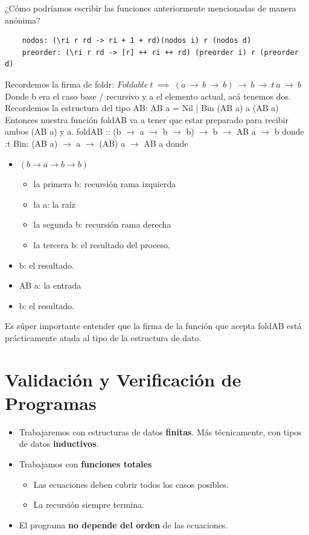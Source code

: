 \documentclass[10pt,a4paper]{article}
\begin{document}
¿Cómo podríamos escribir las funciones anteriormente mencionadas de manera anónima? 
\begin{lstlisting}
    nodos: (\ri r rd -> ri + 1 + rd)(nodos i) r (nodos d)
    preorder: (\ri r rd -> [r] ++ ri ++ rd) (preorder i) r (preorder d)
\end{lstlisting}
Recordemos la firma de foldr: $Foldable \ t \ \implies \ (a \ \rightarrow \ b \ \rightarrow \ b) \ \rightarrow \ b \ \rightarrow \ t \ a \ \rightarrow \ b$ \\
Donde b era el caso base / recursivo y a el elemento actual, acá tenemos dos. \\
Recordemos la estructura del tipo AB: AB a = Nil | Bin (AB a) a (AB a) \\
Entonces nuestra función foldAB va a tener que estar preparado para recibir ambos (AB a) y a.
foldAB :: (b $\rightarrow$ a $\rightarrow$ b $\rightarrow$ b) $\rightarrow$ b $\rightarrow$ AB a $\rightarrow$ b donde :t Bin: (AB a) $\rightarrow$ a $\rightarrow$ (AB) a $\rightarrow$ AB a donde 
\begin{itemize}
    \item $(b \rightarrow a \rightarrow b \rightarrow b)$
    \begin{itemize}
        \item la primera b: recursión rama izquierda
        \item la a: la raíz 
        \item la segunda b: recursión rama derecha 
        \item la tercera b: el resultado del proceso.
    \end{itemize}
    \item b: el resultado.
    \item AB a: la entrada 
    \item b: el resultado.
\end{itemize}
Es súper importante entender que la firma de la función que acepta foldAB está prácticamente atada al tipo de la estructura de dato.
\section*{Validación y Verificación de Programas}
\begin{itemize}
    \item Trabajaremos con estructuras de datos \textbf{finitas}. Más técnicamente, con tipos de datos \textbf{inductivos}.
    \item Trabajamos con \textbf{funciones totales}
    \begin{itemize}
        \item Las ecuaciones deben cubrir todos los casos posibles.
        \item La recursión siempre termina.
    \end{itemize} 
    \item El programa \textbf{no depende del orden} de las ecuaciones. 
\end{itemize}
\end{document}
